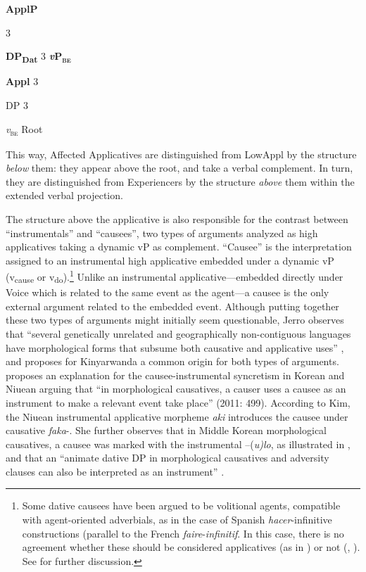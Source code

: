 \documentclass[output=paper,modfonts,nonflat]{langsci/langscibook}
\begin{document}
\textbf{ApplP}

            3 

  \textbf{DP\textsubscript{Dat}}         3   \textbf{\textit{v}}\textbf{P\textsc{\textsubscript{be}}}

                 \textbf{Appl}    3  

                           DP           3  

                              \textit{v}\textsc{\textsubscript{be}         }    Root    \citep[145]{Cuervo2003}

This way, Affected Applicatives are distinguished from LowAppl by the structure \textit{below} them: they appear above the root, and take a verbal complement. In turn, they are distinguished from Experiencers by the structure \textit{above} them within the extended verbal projection.     

The structure above the applicative is also responsible for the contrast between “instrumentals” and “causees”, two types of arguments analyzed as high applicatives taking a dynamic vP as complement. “Causee” is the interpretation assigned to an instrumental high applicative embedded under a dynamic vP (v\textsubscript{cause}  or v\textsubscript{do}).\footnote{Some dative causees have been argued to be volitional agents, compatible with agent-oriented adverbials, as in the case of Spanish \textit{hacer}{}-infinitive constructions (parallel to the French \textit{faire}{}-\textit{infinitif}. In this case, there is no agreement whether these should be considered applicatives (as in \citealt{Torrego2011}) or not (\citealt{Kim2011}, \citealt{Tubino2012}). See  for further discussion.} Unlike an instrumental applicative—embedded directly under Voice which is related to the same event as the agent—a causee is the only external argument related to the embedded event. Although putting together these two types of arguments might initially seem questionable, Jerro observes that “several genetically unrelated and geographically non-contiguous languages have morphological forms that subsume both causative and applicative uses” \citep[752]{Jerro2017}, and proposes for Kinyarwanda a common origin for both types of arguments.  \citet{Kim2011} proposes an explanation for the causee-instrumental syncretism in Korean and Niuean arguing that “in morphological causatives, a causer uses a causee as an instrument to make a relevant event take place” (2011: 499). According to Kim, the Niuean instrumental applicative morpheme \textit{aki} introduces the causee under causative \textit{faka}{}-. She further observes that in Middle Korean morphological causatives, a causee was marked with the instrumental –(\textit{u)lo}, as illustrated in , and that an “animate dative DP in morphological causatives and adversity clauses can also be interpreted as an instrument” \citep[499]{Kim2011}. 
\end{document}
